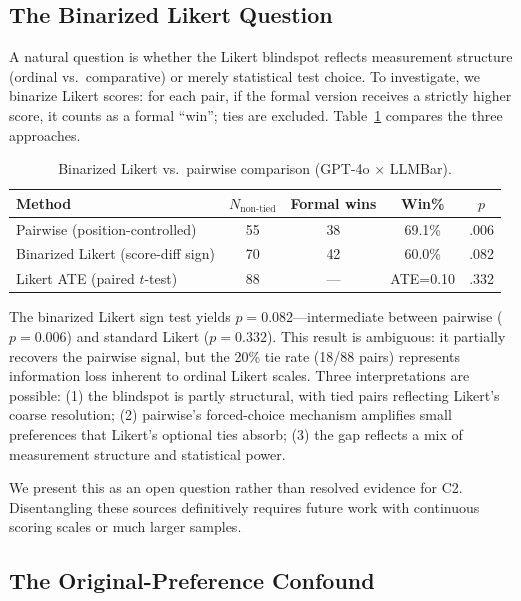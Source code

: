 \documentclass[11pt,a4paper]{article}
\begin{document}
\subsection{The Binarized Likert Question}

A natural question is whether the Likert blindspot reflects measurement structure (ordinal vs.\ comparative) or merely statistical test choice.
To investigate, we binarize Likert scores: for each pair, if the formal version receives a strictly higher score, it counts as a formal ``win''; ties are excluded.
Table~\ref{tab:binarized} compares the three approaches.

\begin{table}[t]
\centering
\small
\caption{Binarized Likert vs.\ pairwise comparison (GPT-4o $\times$ LLMBar).}
\label{tab:binarized}
\begin{tabular}{lcccc}
\toprule
\textbf{Method} & \textbf{$N_{\text{non-tied}}$} & \textbf{Formal wins} & \textbf{Win\%} & \textbf{$p$} \\
\midrule
Pairwise (position-controlled) & 55 & 38 & 69.1\% & .006 \\
Binarized Likert (score-diff sign) & 70 & 42 & 60.0\% & .082 \\
Likert ATE (paired $t$-test) & 88 & --- & ATE=0.10 & .332 \\
\bottomrule
\end{tabular}
\end{table}

The binarized Likert sign test yields $p=0.082$---intermediate between pairwise ($p=0.006$) and standard Likert ($p=0.332$).
This result is ambiguous: it partially recovers the pairwise signal, but the 20\% tie rate (18/88 pairs) represents information loss inherent to ordinal Likert scales.
Three interpretations are possible: (1) the blindspot is partly structural, with tied pairs reflecting Likert's coarse resolution; (2) pairwise's forced-choice mechanism amplifies small preferences that Likert's optional ties absorb; (3) the gap reflects a mix of measurement structure and statistical power.

We present this as an open question rather than resolved evidence for C2.
Disentangling these sources definitively requires future work with continuous scoring scales or much larger samples.

\subsection{The Original-Preference Confound}
\label{sec:discussion_confound}
\end{document}
